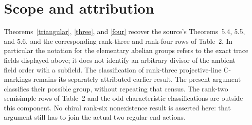 \documentclass[11pt]{article}
\begin{document}
\section*{Scope and attribution}
Theorems~\ref{triangular}, \ref{three}, and \ref{four} recover the
source's Theorems~5.4, 5.5, and 5.6, and the corresponding rank-three
and rank-four rows of Table~2. In particular the notation for the
elementary abelian groups refers to the exact trace fields displayed
above; it does not identify an arbitrary divisor of the ambient field
order with a subfield. The classification of rank-three projective-line
C-markings remains its separately attributed earlier result. The present
argument classifies their possible group, without repeating that census.
The rank-two semisimple rows of Table~2 and the odd-characteristic
classifications are outside this component. No chiral rank-six
nonexistence result is asserted here: that argument still has to join
the actual two regular end actions.
\end{document}
